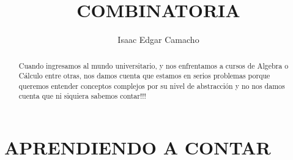 \documentclass[a4paper,16pt]{article}
\title{COMBINATORIA}
\author{Isaac Edgar Camacho}
\begin{document}
\maketitle

\begin{abstract}
Cuando ingresamos al mundo universitario, y nos enfrentamos a cursos de Algebra o C\'alculo entre otras, nos damos cuenta que estamos en serios problemas porque queremos entender conceptos complejos por su nivel de abstracci\'on y no nos damos cuenta que ni siquiera sabemos contar!!! 
\end{abstract}


\section{APRENDIENDO A CONTAR}
\end{document}
